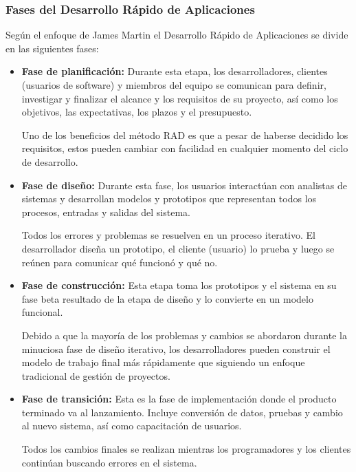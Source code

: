 \subsubsection{Fases del Desarrollo Rápido de Aplicaciones}

Según el enfoque de James Martin \cite{RADJamesMartin} el Desarrollo Rápido de Aplicaciones se divide en las siguientes fases:

\begin{itemize}
    \item \textbf{Fase de planificación:} Durante esta etapa, los desarrolladores, clientes (usuarios de software) y miembros del equipo se comunican para definir, investigar y finalizar el alcance y los requisitos de su proyecto, así como los objetivos, las expectativas, los plazos y el presupuesto. 
    
    Uno de los beneficios del método RAD es que a pesar de haberse decidido los requisitos, estos pueden cambiar con facilidad en cualquier momento del ciclo de desarrollo.

    \item \textbf{Fase de diseño:} Durante esta fase, los usuarios interactúan con analistas de sistemas y desarrollan modelos y prototipos que representan todos los procesos, entradas y salidas del sistema.
    
    Todos los errores y problemas se resuelven en un proceso iterativo. El desarrollador diseña un prototipo, el cliente (usuario) lo prueba y luego se reúnen para comunicar qué funcionó y qué no.

    \item \textbf{Fase de construcción:} Esta etapa toma los prototipos y el sistema en su fase beta resultado de la etapa de diseño y lo convierte en un modelo funcional.

    Debido a que la mayoría de los problemas y cambios se abordaron durante la minuciosa fase de diseño iterativo, los desarrolladores pueden construir el modelo de trabajo final más rápidamente que siguiendo un enfoque tradicional de gestión de proyectos.

    \item \textbf{Fase de transición:} Esta es la fase de implementación donde el producto terminado va al lanzamiento. Incluye conversión de datos, pruebas y cambio al nuevo sistema, así como capacitación de usuarios.

    Todos los cambios finales se realizan mientras los programadores y los clientes continúan buscando errores en el sistema.

\end{itemize}



